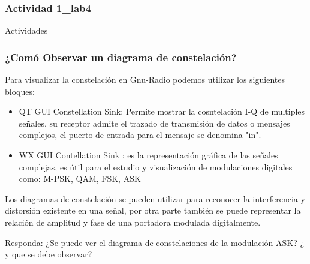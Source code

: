 \subsubsection{Actividad 1_lab4}

\begin{frame}

\begin{block}{}
\centering
\vspace{8mm}
\Large{Actividades}
\vspace{8mm}
\end{block}
\end{frame}

\begin{frame}


\frametitle{\underline{\textbf{¿Comó Observar un diagrama de constelación?}}}

\begin{flushleft}
Para visualizar la constelación en Gnu-Radio podemos utilizar los siguientes bloques:
\end{flushleft}
  
\begin{itemize}
\item {
QT GUI Constellation Sink: Permite mostrar la cosntelación I-Q de multiples señales, su   receptor admite el trazado de transmisión de datos o mensajes complejos, el puerto de entrada para el mensaje se denomina "in". }
\end{itemize}
\begin{itemize}
\item {
WX GUI Contellation Sink : es la representación gráfica de las señales complejas, es  útil  para  el  estudio  y  visualización  de  modulaciones digitales  como:  M-PSK, QAM, FSK, ASK}
\end{itemize}
\end{frame}

\begin{frame}
\begin{flushleft}
Los diagramas de constelación se pueden utilizar para reconocer la interferencia y distorsión existente en una señal, por otra parte también se puede representar la relación de amplitud y fase de una portadora modulada digitalmente. 
\item Responda: ¿Se puede ver el diagrama de constelaciones de la modulación ASK?
 ¿ y que se debe observar?
\end{flushleft}
\end{frame}


